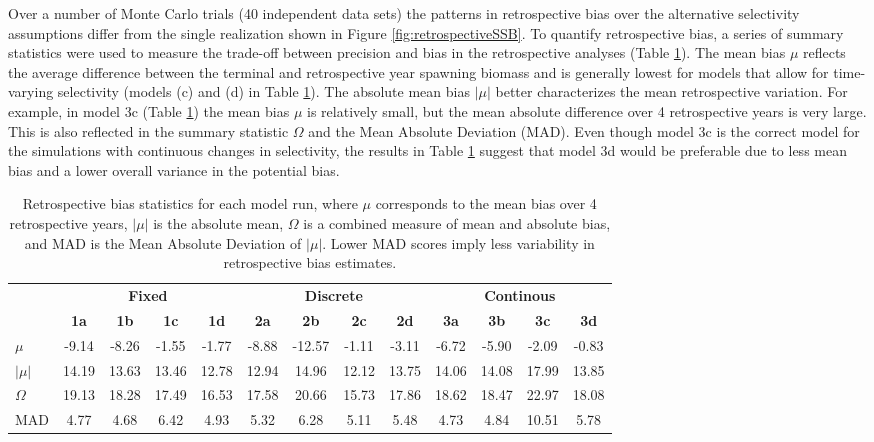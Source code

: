 Over a number of Monte Carlo trials (40 independent data sets) the patterns in retrospective bias over the alternative selectivity assumptions differ from the single realization shown in Figure \ref{fig:retrospectiveSSB}.  To quantify retrospective bias, a series of summary statistics were used to measure the trade-off between precision and bias in the retrospective analyses (Table \ref{tab:RetroStatistics}).  The mean bias $\mu$ reflects the average difference between the terminal and retrospective year spawning biomass and is generally lowest for models that allow for time-varying selectivity (models (c) and (d) in Table \ref{tab:RetroStatistics}).  The absolute mean bias $|\mu|$ better characterizes the mean retrospective  variation.  For example, in model 3c (Table \ref{tab:RetroStatistics}) the mean bias $\mu$ is relatively small, but the mean absolute difference over 4 retrospective years is very large.  This is also reflected in the summary statistic $\Omega$ and the Mean Absolute Deviation (MAD).  Even though model 3c is the correct model for the simulations with continuous changes in selectivity, the results in Table \ref{tab:RetroStatistics} suggest that model 3d would be preferable due to less mean bias and a lower overall variance in the potential bias.  

\begin{table}[!tbh]
	\caption{Retrospective bias statistics for each model run, where $\mu$ corresponds to the mean bias over 4 retrospective years, $|\mu|$ is the absolute mean, $\Omega$ is a combined measure of mean and absolute bias, and MAD is the Mean Absolute Deviation of $|\mu|$.  Lower MAD scores imply less variability in retrospective bias estimates.}
	\label{tab:RetroStatistics}
	\begin{center}
	\begin{footnotesize}
		
		\begin{tabular}{l|cccc|cccc|cccc}
		\hline

		\hline
		&\multicolumn{4}{c|}{\textbf{Fixed}} & \multicolumn{4}{c|}{\textbf{Discrete}} & \multicolumn{4}{c}{\textbf{Continous}} \\
		&\textbf{1a}  &\textbf{1b}  &\textbf{1c}  &\textbf{1d}  &\textbf{2a}   &\textbf{2b}  &\textbf{2c}  &\textbf{2d}  &\textbf{3a}  &\textbf{3b}  &\textbf{3c}  &\textbf{3d}\\
		\hline
		$\mu$     &-9.14& -8.26& -1.55& -1.77& -8.88& -12.57& -1.11& -3.11& -6.72& -5.90& -2.09& -0.83\\
		$|\mu|$ &14.19& 13.63& 13.46& 12.78& 12.94&  14.96& 12.12& 13.75& 14.06& 14.08& 17.99& 13.85\\
		$\Omega$  &19.13& 18.28& 17.49& 16.53& 17.58&  20.66& 15.73& 17.86& 18.62& 18.47& 22.97& 18.08\\
		MAD    & 4.77&  4.68&  6.42&  4.93&  5.32&   6.28&  5.11&  5.48&  4.73&  4.84& 10.51&  5.78\\

		\hline

		\hline
		\end{tabular}
	\end{footnotesize}
	\end{center}
\end{table}

